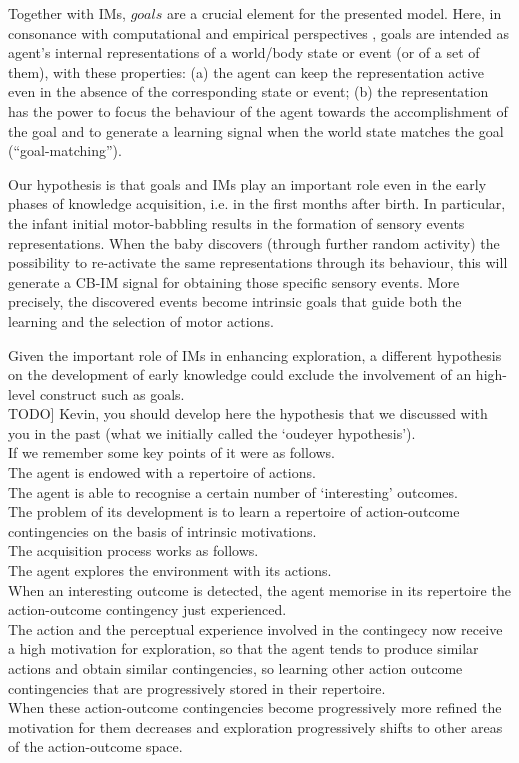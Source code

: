 Together with IMs, $goals$ are a crucial element for the presented model. Here, in consonance with computational and empirical perspectives \citep{Russell2003,Thill2013}, goals are intended as agent's internal representations of a world/body state or event (or of a set of them), with these properties: (a) the agent can keep the representation active even in the absence of the corresponding state or event; (b) the representation has the power to focus the behaviour of the agent towards the accomplishment of the goal and to generate a learning signal when the world state matches the goal (``goal-matching'').

Our hypothesis is that goals and IMs play an important role even in the early phases of knowledge acquisition, i.e. in the first months after birth. In particular, the infant initial motor-babbling results in the formation of sensory events representations. When the baby discovers (through further random activity) the possibility to re-activate the same representations through its behaviour, this will generate a CB-IM signal for obtaining those specific sensory events. More precisely, the discovered events become intrinsic goals that guide both the learning and the selection of motor actions. 

Given the important role of IMs in enhancing exploration, a different hypothesis on the development of early knowledge could exclude the involvement of an high-level construct such as goals.\\
TODO] Kevin, you should develop here the hypothesis that we discussed with you in the past (what we initially called the `oudeyer hypothesis').\\
If we remember some key points of it were as follows.\\
The agent is endowed with a repertoire of actions.\\
The agent is able to recognise a certain number of `interesting' outcomes.\\
The problem of its development is to learn a repertoire of action-outcome contingencies on the basis of intrinsic motivations.\\
The acquisition process works as follows.\\
The agent explores the environment with its actions.\\
When an interesting outcome is detected, the agent memorise in its repertoire the action-outcome contingency just experienced.\\
The action and the perceptual experience involved in the contingecy now receive a high motivation for exploration, so that the agent tends to produce similar actions and obtain similar contingencies, so learning other action outcome contingencies that are progressively stored in their repertoire.\\
When these action-outcome contingencies become progressively more refined the motivation for them decreases and exploration progressively shifts to other areas of the action-outcome space.

